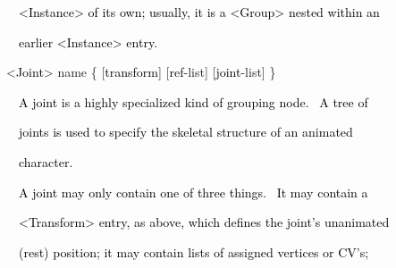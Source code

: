 \documentclass[a4paper]{article}
\newcommand\textstyleOOoComputerKeyWord[1]{\textrm{\textcolor[rgb]{0.0,0.0,0.5019608}{#1}}}
\newcommand\textstyleOOoAssemblerSpecialChar[1]{\textrm{\textcolor[rgb]{0.0,0.5019608,0.0}{#1}}}
\newcommand\textstyleOOoAssemblerIdent[1]{\textrm{\textcolor{black}{#1}}}
\newcommand\textstyleOOoAssemblerDirective[1]{\textrm{\textcolor[rgb]{0.0,0.5019608,1.0}{#1}}}
\begin{document}
{\color{black}
\textstyleOOoComputerKeyWord{\textcolor{black}{\ \ {\textless}Instance{\textgreater} of its own; usually, it is a
{\textless}Group{\textgreater} nested within an}}}

{\color{black}
\textstyleOOoComputerKeyWord{\textcolor{black}{\ \ earlier {\textless}Instance{\textgreater} entry.}}}


\bigskip


\bigskip

{\color{black}
\textstyleOOoAssemblerSpecialChar{{\textless}}\textstyleOOoAssemblerIdent{Joint}\textstyleOOoAssemblerSpecialChar{{\textgreater}}\textstyleOOoComputerKeyWord{\textcolor{black}{
}}\textstyleOOoAssemblerDirective{name}\textstyleOOoComputerKeyWord{\textcolor{black}{
}}\textstyleOOoAssemblerSpecialChar{\{}\textstyleOOoComputerKeyWord{\textcolor{black}{
}}\textstyleOOoAssemblerSpecialChar{[}\textstyleOOoAssemblerIdent{transform}\textstyleOOoAssemblerSpecialChar{]}\textstyleOOoComputerKeyWord{\textcolor{black}{
}}\textstyleOOoAssemblerSpecialChar{[}\textstyleOOoAssemblerIdent{ref}\textstyleOOoAssemblerSpecialChar{{}-}\textstyleOOoAssemblerDirective{list}\textstyleOOoAssemblerSpecialChar{]}\textstyleOOoComputerKeyWord{\textcolor{black}{
}}\textstyleOOoAssemblerSpecialChar{[}\textstyleOOoAssemblerIdent{joint}\textstyleOOoAssemblerSpecialChar{{}-}\textstyleOOoAssemblerDirective{list}\textstyleOOoAssemblerSpecialChar{]}\textstyleOOoComputerKeyWord{\textcolor{black}{
}}\textstyleOOoAssemblerSpecialChar{\}}}


\bigskip

{\color{black}
\textstyleOOoComputerKeyWord{\textcolor{black}{\ \ A joint is a highly specialized kind of grouping node. \ A tree of}}}

{\color{black}
\textstyleOOoComputerKeyWord{\textcolor{black}{\ \ joints is used to specify the skeletal structure of an animated}}}

{\color{black}
\textstyleOOoComputerKeyWord{\textcolor{black}{\ \ character.}}}


\bigskip

{\color{black}
\textstyleOOoComputerKeyWord{\textcolor{black}{\ \ A joint may only contain one of three things. \ It may contain a}}}

{\color{black}
\textstyleOOoComputerKeyWord{\textcolor{black}{\ \ {\textless}Transform{\textgreater} entry, as above, which defines the
joint's unanimated}}}

{\color{black}
\textstyleOOoComputerKeyWord{\textcolor{black}{\ \ (rest) position; it may contain lists of assigned vertices or
CV's;}}}
\end{document}
